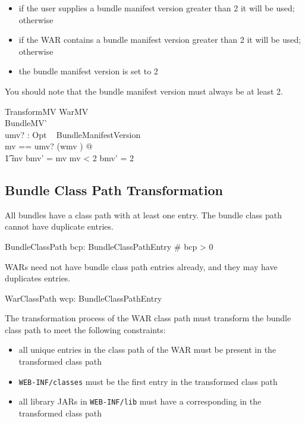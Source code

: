 \documentclass[a4paper,12pt]{article}
\begin{document}
\begin{itemize}
\item if the user supplies a bundle manifest version greater than 2 it will be used; otherwise
\item if the WAR contains a bundle manifest version greater than 2 it will be used; otherwise
\item the bundle manifest version is set to 2 
\end{itemize}

You should note that the bundle manifest version must always be at least 2.

\begin{schema}{TransformMV}
WarMV \\
BundleMV' \\
umv? : Opt ~ BundleManifestVersion \\
\where
\LET mv == umv?  (wmv ) @ \\
\t1 mv  \implies bmv' = mv \land mv < 2 \implies bmv' = 2
\end{schema}

\subsection{Bundle Class Path Transformation}

All bundles have a class path with at least one entry. The bundle class path cannot have duplicate entries.

\begin{schema}{BundleClassPath}
bcp: \iseq BundleClassPathEntry
\where
\# bcp > 0 \\
\end{schema}

WARs need not have bundle class path entries already, and they may have duplicates entries.

\begin{schema}{WarClassPath}
wcp: \seq BundleClassPathEntry
\end{schema}

The transformation process of the WAR class path must transform the bundle class path to meet the following constraints:

\begin{itemize}
\item all unique entries in the class path of the WAR must be present in the transformed class path
\item {\tt WEB-INF/classes} must be the first entry in the transformed class path
\item all library JARs in {\tt WEB-INF/lib} must have a corresponding in the transformed class path
\end{itemize}
\end{document}
